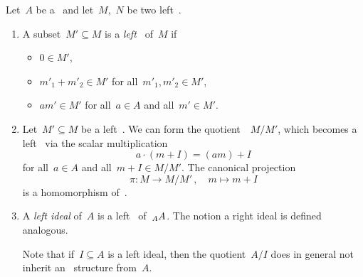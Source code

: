 \begin{remarkdefinition}
  Let~$A$ be a~{\kalg} and let~$M$,~$N$ be two left~{}.
  \begin{enumerate}
    \item
      A subset~$M' \subseteq M$ is a \emph{left~{}} of~$M$ if
      \begin{itemize}
        \item
          $0 \in M'$,
        \item
          $m'_1 + m'_2 \in M'$ for all~$m'_1, m'_2 \in M'$,
        \item
          $a m' \in M'$ for all~$a \in A$ and all~$m' \in M'$.
      \end{itemize}
    \item
      Let~$M' \subseteq M$ be a left~{}.
      We can form the quotient~{\module{$\kf$}}~$M/M'$, which becomes a left~{} via the scalar multiplication
      \[
          a \cdot (m + I)
        = (am) + I
      \]
      for all~$a \in A$ and all~$m + I \in M/M'$.
      The canonical projection
      \[
                \pi
        \colon  M
        \to     M/M' \,,
        \quad   m
        \mapsto m + I
      \]
      is a homomorphism of~{}.
    \item
      A \emph{left ideal} of~$A$ is a left~{} of~$\indmodule[A]{A}$.
      The notion a right ideal is defined analogous.
      
      Note that if~$I \subseteq A$ is a left ideal, then the quotient~$A/I$ does in general not inherit an~{\kalg} structure from~$A$.


\end{enumerate}
\end{remarkdefinition}
